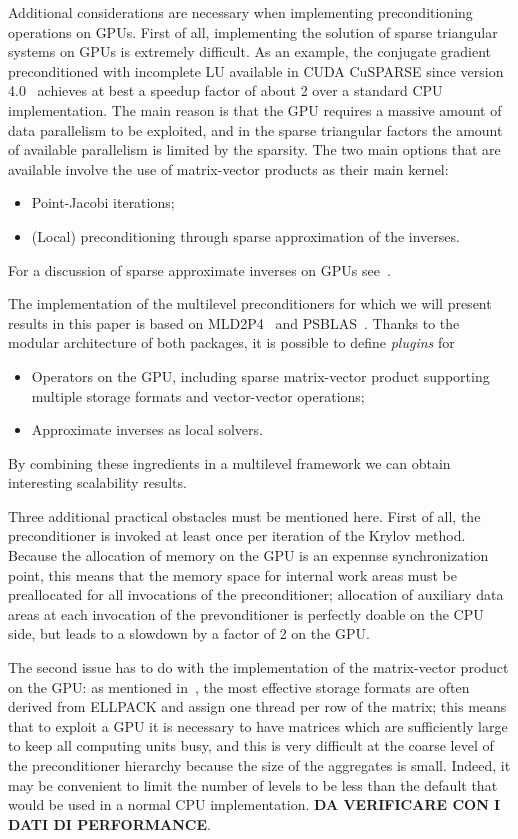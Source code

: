 Additional considerations are necessary when implementing
preconditioning operations on GPUs. First of all, implementing the
solution of sparse triangular systems on GPUs is extremely difficult.
As an example, the conjugate gradient preconditioned with incomplete
LU available in CUDA CuSPARSE since version 4.0~\cite{Naumov11}
achieves at best a speedup factor of about 2 over a standard CPU
implementation. The main reason is that the GPU requires a massive
amount of data parallelism to be exploited, and in the sparse
triangular factors the amount of available parallelism is limited by
the sparsity. 
The two main  options that  are available  involve the use of
matrix-vector products as their main kernel:
\begin{itemize}
\item Point-Jacobi iterations; 
\item (Local) preconditioning through sparse approximation of the
  inverses.
\end{itemize}
For a discussion of sparse approximate inverses on GPUs 
see~\cite{BERTACCINI2016693}. 


The implementation of the multilevel preconditioners for which we will
present results in this paper is based on MLD2P4~\cite{mld-toms} and
PSBLAS~\cite{psblas3}. Thanks to the modular architecture of both
packages, it is possible to define \emph{plugins} for 
\begin{itemize}
\item Operators on the GPU, including sparse matrix-vector product
  supporting multiple storage formats and vector-vector operations;
\item Approximate inverses as local solvers.
\end{itemize}
By combining these ingredients in a multilevel framework we can obtain
interesting scalability results. 

Three additional practical obstacles must be mentioned here. 
First of all, the preconditioner is invoked at least once per
iteration of the Krylov method.  Because the allocation of memory
on the GPU is an expennse synchronization point, this means that the
memory space for internal work areas must be preallocated for all
invocations  of the preconditioner; allocation of auxiliary data areas at
each invocation of the prevonditioner is perfectly doable on the CPU
side, but leads to a slowdown by a factor of 2 on the GPU. 

The second issue has to do with the implementation of the
matrix-vector product on the GPU: as mentioned
in~\cite{Filippone:2017:SMM:3034774.3017994}, the most effective
storage formats are often derived from ELLPACK  and assign one thread
per row of the matrix; this means that to exploit a GPU it is
necessary to have matrices which are sufficiently large to keep all
computing units busy, and this is very difficult at the coarse level
of the preconditioner hierarchy because the size of the aggregates is
small. Indeed, it may be convenient to limit the number of levels to
be less than the default that would be used in a normal CPU
implementation. 
{\bf DA VERIFICARE CON I DATI DI PERFORMANCE}. 

